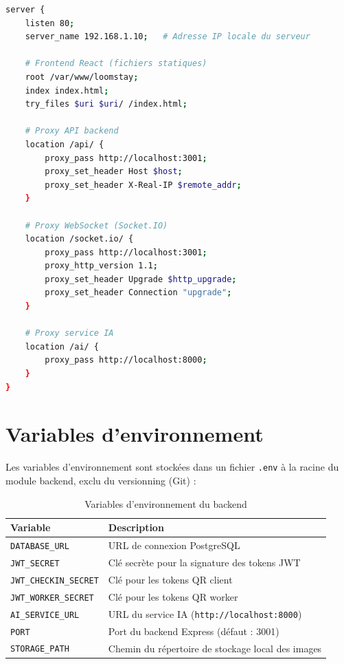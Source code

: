\begin{lstlisting}[language=bash, caption={Exemple de configuration Nginx (loomstay.conf)}]
server {
    listen 80;
    server_name 192.168.1.10;   # Adresse IP locale du serveur

    # Frontend React (fichiers statiques)
    root /var/www/loomstay;
    index index.html;
    try_files $uri $uri/ /index.html;

    # Proxy API backend
    location /api/ {
        proxy_pass http://localhost:3001;
        proxy_set_header Host $host;
        proxy_set_header X-Real-IP $remote_addr;
    }

    # Proxy WebSocket (Socket.IO)
    location /socket.io/ {
        proxy_pass http://localhost:3001;
        proxy_http_version 1.1;
        proxy_set_header Upgrade $http_upgrade;
        proxy_set_header Connection "upgrade";
    }

    # Proxy service IA
    location /ai/ {
        proxy_pass http://localhost:8000;
    }
}
\end{lstlisting}

\section{Variables d'environnement}
\label{sec:variables_env}

Les variables d'environnement sont stockées dans un fichier \texttt{.env} à la racine du module backend, exclu du versionning (Git) :

\begin{table}[H]
\centering
\caption{Variables d'environnement du backend}
\label{tab:variables_env}
\begin{tabular}{|l|l|}
\hline
\textbf{Variable} & \textbf{Description} \\
\hline
\texttt{DATABASE\_URL} & URL de connexion PostgreSQL \\
\hline
\texttt{JWT\_SECRET} & Clé secrète pour la signature des tokens JWT \\
\hline
\texttt{JWT\_CHECKIN\_SECRET} & Clé pour les tokens QR client \\
\hline
\texttt{JWT\_WORKER\_SECRET} & Clé pour les tokens QR worker \\
\hline
\texttt{AI\_SERVICE\_URL} & URL du service IA (\texttt{http://localhost:8000}) \\
\hline
\texttt{PORT} & Port du backend Express (défaut : 3001) \\
\hline
\texttt{STORAGE\_PATH} & Chemin du répertoire de stockage local des images \\
\hline
\end{tabular}
\end{table}

